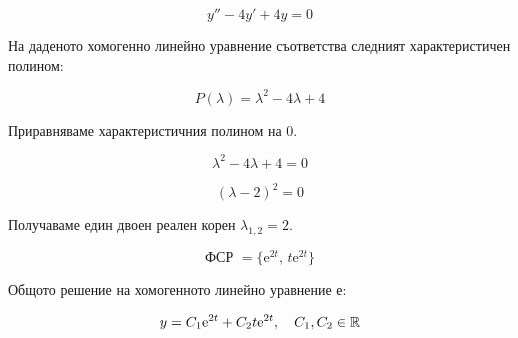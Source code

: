 \documentclass{scrartcl}
\begin{document}
\begin{FlushLeft}
$$y'' - 4y' + 4y = 0$$

На даденото хомогенно линейно уравнение съответства следният характеристичен полином:

$$P(\lambda) = \lambda^2 -4 \lambda + 4$$

Приравняваме характеристичния полином на $0$.

$$\lambda^2 - 4\lambda + 4 = 0$$

$$(\lambda - 2)^2 = 0$$

Получаваме един двоен реален корен $\lambda_{1,2} = 2$.

$$\text{ФСР }=\lbrace \mathrm{e}^{2t}, \, t\mathrm{e}^{2t} \rbrace$$

Общото решение на хомогенното линейно уравнение е:

$$y = C_1 \mathrm{e}^{2t} + C_2 t\mathrm{e}^{2t}, \quad C_1, \space C_2 \in \mathbb{R}$$

\end{FlushLeft}
\end{document}

